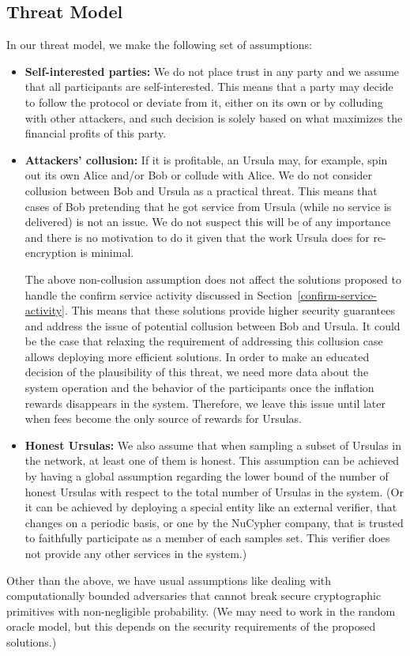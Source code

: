 \subsection{Threat Model}
In our threat model, we make the following set of assumptions:
\begin{itemize}
\item {\bf Self-interested parties:} We do not place trust in any party and we assume that all participants are 
self-interested. This means that a party may decide to follow the protocol or deviate from it, either on its own or by colluding with other attackers, and such decision is solely based on what maximizes the financial profits
of this party.

\item {\bf Attackers' collusion:} If it is profitable, an Ursula may, for example, spin out  its own Alice and/or Bob or collude with Alice. We do not consider collusion between Bob and Ursula as a practical threat. This means that cases of Bob pretending  that he got service from Ursula (while no service is delivered) is not an issue. We do not 
suspect this will be of any importance and there is no motivation to do it given that the work Ursula does for re-encryption is minimal.

The above non-collusion assumption does not affect the solutions proposed to handle the confirm service activity discussed in Section~\ref{confirm-service-activity}. This means that these solutions provide higher security guarantees and address the issue of potential collusion between Bob and Ursula. It could be the case that relaxing the requirement of addressing this collusion case allows deploying more efficient solutions. In order to make an educated decision of the plausibility of this threat, we need more data about the system operation and the behavior of the participants once the inflation rewards disappears in the system. Therefore, we leave this 
issue until later when fees become the only source of rewards for Ursulas.

\item {\bf Honest Ursulas:} We also assume that when sampling a subset of Ursulas in the network, at least one of them is honest. This assumption can be achieved by having a global assumption regarding the lower bound of the number of honest Ursulas with respect to the total number of Ursulas in the system. (Or it can be achieved by deploying a special entity like an external verifier, that changes on a periodic basis, or one by the NuCypher company, that is trusted to faithfully participate as a member of each samples set. This verifier does not provide any other services in the system.)
\end{itemize}


Other than the above, we have usual assumptions like dealing with computationally bounded adversaries 
that cannot break secure cryptographic primitives with non-negligible probability. (We may need to work in the random oracle model, but this depends on the security requirements of the proposed solutions.)



